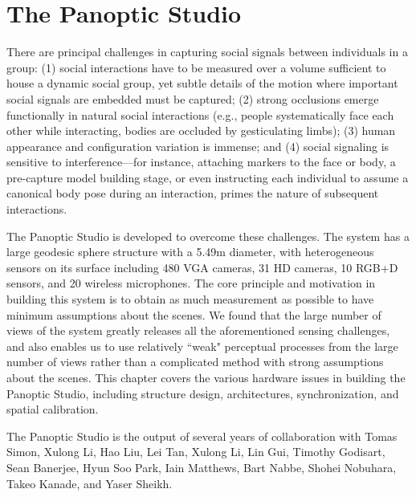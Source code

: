 \chapter{The Panoptic Studio}%
\label{chapter:system}

There are principal challenges in capturing social signals between individuals in a group: (1) social interactions have to be measured over a volume sufficient to house a dynamic social group, yet subtle details of the motion where important social signals are embedded must be captured; (2) strong occlusions emerge functionally in natural social interactions (e.g., people systematically face each other while interacting, bodies are occluded by gesticulating limbs); (3) human appearance and configuration variation is immense; and (4) social signaling is sensitive to interference---for instance, attaching markers to the face or body, a pre-capture model building stage, or even instructing each individual to assume a canonical body pose during an interaction, primes the nature of subsequent interactions. 

The Panoptic Studio is developed to overcome these challenges. The system has a large geodesic sphere structure with a 5.49m diameter, with heterogeneous sensors on its surface including 480 VGA cameras, 31 HD cameras, 10 RGB+D sensors, and 20 wireless microphones. The core principle and motivation in building this system is to obtain as much measurement as possible to have minimum assumptions about the scenes. We found that the large number of views of the system greatly releases all the aforementioned sensing challenges, and also enables us to use relatively ``weak" perceptual processes from the large number of views rather than a complicated method with strong assumptions about the scenes. This chapter covers the various hardware issues in building the Panoptic Studio, including structure design, architectures, synchronization, and spatial calibration.  


The Panoptic Studio is the output of several years of collaboration with Tomas Simon, Xulong Li, Hao Liu, Lei Tan, Xulong Li, Lin Gui, Timothy Godisart, Sean Banerjee, Hyun Soo Park, Iain Matthews, Bart Nabbe, Shohei Nobuhara, Takeo Kanade, and Yaser Sheikh. 

